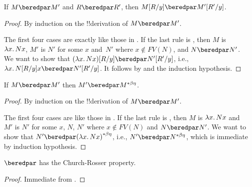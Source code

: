 \documentclass[../../../include/open-logic-section]{subfiles}
\begin{document}
\begin{lem}
  If $M \beredpar M'$ and $R \beredpar R'$, then $\Subst{M}{R}{y}
  \beredpar \Subst{M'}{R'}{y}$.
\end{lem}

\begin{proof}
  By induction on the !!{derivation} of $M \beredpar M'$.

  The first four cases are exactly like those in .
  If the last rule is , then $M$ is
  $\lambd[x][Nx]$, $M'$ is $N'$ for some $x$ and~$N'$ where $x \notin
  FV(N)$, and $N \beredpar N'$. We want to show that
  $\Subst{(\lambd[x][Nx])}{R}{y} \beredpar \Subst{N'}{R'}{y}$, i.e.,
  $\lambd[x][\Subst{N}{R}{y} x] \beredpar \Subst{N'}{R'}{y}$. It
  follows by  and the
  induction hypothesis.
\end{proof}

\begin{lem}
  If $M \beredpar M'$ then $M' \beredpar \becd{M}$.
\end{lem}

\begin{proof}
  By induction on the !!{derivation} of $M \beredpar M'$.

  The first four cases are like those in . If the
  last rule is , then $M$ is $\lambd[x][Nx]$ and
  $M'$ is $N'$ for some $x$, $N$, $N'$ where $x \notin FV(N)$ and $N
  \beredpar N'$. We want to show that $N' \beredpar
  \becd{(\lambd[x][Nx])}$, i.e., $N' \beredpar \becd{N}$, which is
  immediate by induction hypothesis.
\end{proof}

\begin{thm}
  $\beredpar$ has the Church-Rosser property.
\end{thm}

\begin{proof}
  Immediate from .
\end{proof}
\end{document}

